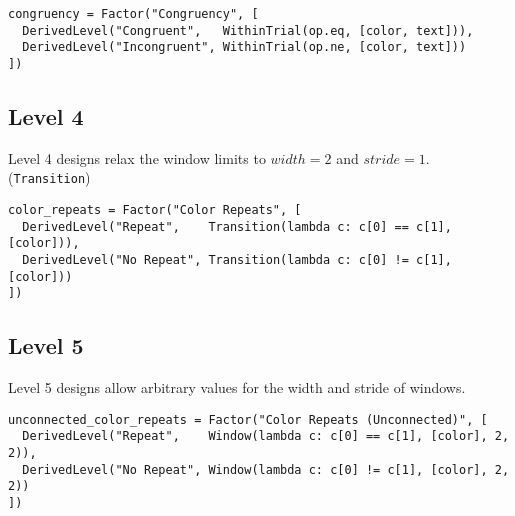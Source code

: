 \begin{verbatim}
congruency = Factor("Congruency", [
  DerivedLevel("Congruent",   WithinTrial(op.eq, [color, text])),
  DerivedLevel("Incongruent", WithinTrial(op.ne, [color, text]))
])
\end{verbatim}

\subsection{Level 4}

Level 4 designs relax the window limits to $width=2$ and $stride=1$. (\texttt{Transition})

\begin{verbatim}
color_repeats = Factor("Color Repeats", [
  DerivedLevel("Repeat",    Transition(lambda c: c[0] == c[1], [color])),
  DerivedLevel("No Repeat", Transition(lambda c: c[0] != c[1], [color]))
])
\end{verbatim}


\subsection{Level 5}

Level 5 designs allow arbitrary values for the width and stride of windows.

\begin{verbatim}
unconnected_color_repeats = Factor("Color Repeats (Unconnected)", [
  DerivedLevel("Repeat",    Window(lambda c: c[0] == c[1], [color], 2, 2)),
  DerivedLevel("No Repeat", Window(lambda c: c[0] != c[1], [color], 2, 2))
])
\end{verbatim}

